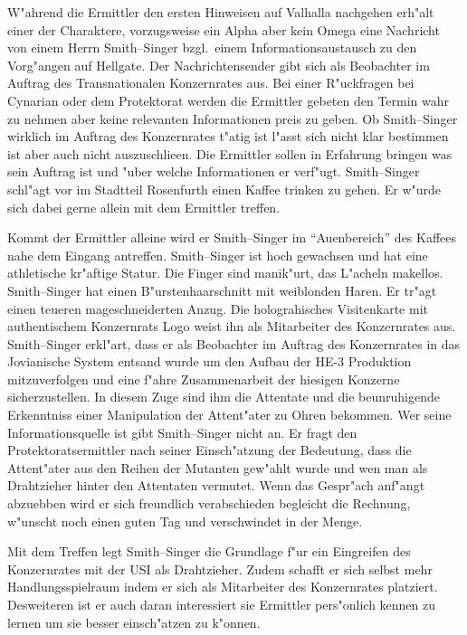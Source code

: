 W"ahrend die Ermittler den ersten Hinweisen auf Valhalla nachgehen erh"alt einer der Charaktere, vorzugsweise ein Alpha aber kein Omega eine Nachricht von einem Herrn Smith--Singer bzgl.~einem Informationsaustausch zu den Vorg"angen auf Hellgate. Der Nachrichtensender gibt sich als Beobachter im Auftrag des Transnationalen Konzernrates aus. Bei einer R"uckfragen bei Cynarian oder dem Protektorat werden die Ermittler gebeten den Termin wahr zu nehmen aber keine relevanten Informationen preis zu geben. Ob Smith--Singer wirklich im Auftrag des Konzernrates t"atig ist l"asst sich nicht klar bestimmen ist aber auch nicht auszuschlie\3en. Die Ermittler sollen in Erfahrung bringen was sein Auftrag ist und "uber welche Informationen er verf"ugt. Smith--Singer schl"agt vor im Stadtteil Rosenfurth einen Kaffee trinken zu gehen. Er w"urde sich dabei gerne allein mit dem Ermittler treffen.

Kommt der Ermittler alleine wird er Smith--Singer im "`Au\3enbereich"' des Kaffees nahe dem Eingang antreffen. Smith--Singer ist hoch gewachsen und hat eine athletische kr"aftige Statur. Die Finger sind manik"urt, das L"acheln makellos. Smith--Singer hat einen B"urstenhaarschnitt mit wei\3blonden Haren. Er tr"agt einen teueren ma\3geschneiderten Anzug. Die holograhisches Visitenkarte mit authentischem Konzernrats Logo weist ihn als Mitarbeiter des Konzernrates aus. Smith--Singer erkl"art, dass er als Beobachter im Auftrag des Konzernrates in das Jovianische System entsand wurde um den Aufbau der HE-3 Produktion mitzuverfolgen und eine f"ahre Zusammenarbeit der hiesigen Konzerne sicherzustellen. In diesem Zuge sind ihm die Attentate und die beunruhigende Erkenntniss einer Manipulation der Attent"ater zu Ohren bekommen. Wer seine Informationsquelle ist gibt Smith--Singer nicht an. Er fragt den Protektoratsermittler nach seiner Einsch"atzung der Bedeutung, dass die Attent"ater aus den Reihen der Mutanten gew"ahlt wurde und wen man als Drahtzieher hinter den Attentaten vermutet. Wenn das Gespr"ach anf"angt abzuebben wird er sich freundlich verabschieden begleicht die Rechnung, w"unscht noch einen guten Tag und verschwindet in der Menge.

Mit dem Treffen legt Smith--Singer die Grundlage f"ur ein Eingreifen des Konzernrates mit der USI als Drahtzieher. Zudem schafft er sich selbst mehr Handlungsspielraum indem er sich als Mitarbeiter des Konzernrates platziert. Desweiteren ist er auch daran interessiert sie Ermittler pers"onlich kennen zu lernen um sie besser einsch"atzen zu k"onnen.

